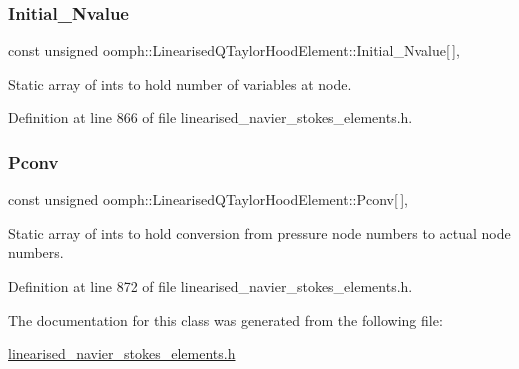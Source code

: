 \subsubsection{\texorpdfstring{Initial\+\_\+\+Nvalue}{Initial\_Nvalue}}
{\footnotesize\ttfamily const unsigned oomph\+::\+Linearised\+Q\+Taylor\+Hood\+Element\+::\+Initial\+\_\+\+Nvalue\mbox{[}$\,$\mbox{]}\hspace{0.3cm}{\ttfamily [static]}, {\ttfamily [private]}}



Static array of ints to hold number of variables at node. 



Definition at line 866 of file linearised\+\_\+navier\+\_\+stokes\+\_\+elements.\+h.

\mbox{\label{classoomph_1_1LinearisedQTaylorHoodElement_ab3be53133596f00d3f97f4939ed57bbc}} 
\subsubsection{\texorpdfstring{Pconv}{Pconv}}
{\footnotesize\ttfamily const unsigned oomph\+::\+Linearised\+Q\+Taylor\+Hood\+Element\+::\+Pconv\mbox{[}$\,$\mbox{]}\hspace{0.3cm}{\ttfamily [static]}, {\ttfamily [protected]}}



Static array of ints to hold conversion from pressure node numbers to actual node numbers. 



Definition at line 872 of file linearised\+\_\+navier\+\_\+stokes\+\_\+elements.\+h.



The documentation for this class was generated from the following file\+:\begin{DoxyCompactItemize}
\item 
\hyperlink{linearised__navier__stokes__elements_8h}{linearised\+\_\+navier\+\_\+stokes\+\_\+elements.\+h}\end{DoxyCompactItemize}
